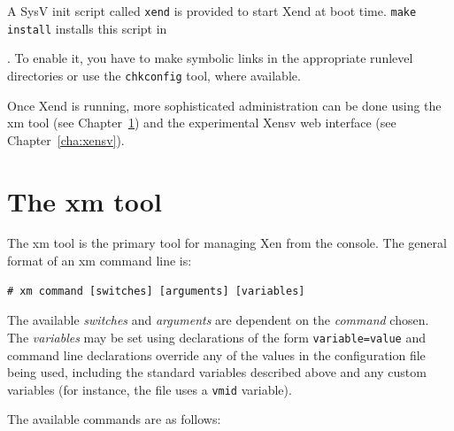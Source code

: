 \documentclass[11pt,twoside,final,openright]{xenstyle}
\begin{document}
A SysV init script called {\tt xend} is provided to start Xend at boot
time.  {\tt make install} installs this script in {.
To enable it, you have to make symbolic links in the appropriate
runlevel directories or use the {\tt chkconfig} tool, where available.

Once Xend is running, more sophisticated administration can be done
using the xm tool (see Chapter~\ref{cha:xm}) and the experimental
Xensv web interface (see Chapter~\ref{cha:xensv}).

\chapter{The xm tool}
\label{cha:xm}

The xm tool is the primary tool for managing Xen from the console.
The general format of an xm command line is:

\begin{verbatim}
# xm command [switches] [arguments] [variables]
\end{verbatim}

The available {\em switches } and {\em arguments} are dependent on the
{\em command} chosen.  The {\em variables} may be set using
declarations of the form {\tt variable=value} and command line
declarations override any of the values in the configuration file
being used, including the standard variables described above and any
custom variables (for instance, the  file uses a
{\tt vmid} variable).

The available commands are as follows:

}
\end{document}
